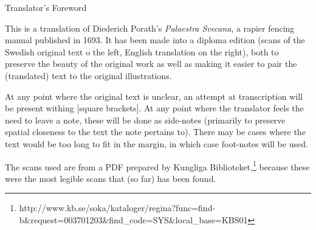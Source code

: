 {\large Translator's Foreword}

This is a translation of Diederich Porath's {\it Palaestra Svecana}, a rapier fencing manual published in 1693. It has been made into a diploma edition (scans of the Swedish original text o the left, English translation on the right), both to preserve the beauty of the original work as well as making it easier to pair the (translated) text to the original illustrations.

At any point where the original text is unclear, an attempt at transcription will be present withing [square brackets]. At any point where the translator feels the need to leave a note, these will be done as side-notes (primarily to preserve spatial closeness to the text the note pertains to).  There may be cases where the text would be too long to fit in the margin, in which case foot-notes will be used.

The scans used are from a PDF prepared by Kungliga Biblioteket,\footnote{ http://www.kb.se/soka/kataloger/regina?func=find-b\&request=003701203\&find\_code=SYS\&local\_base=KBS01} because these were the most legible scans that (so far) has been found.
